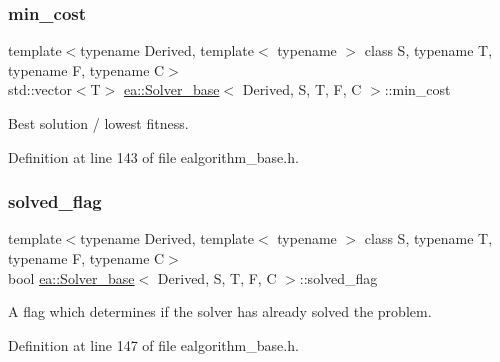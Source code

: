 \mbox{\label{classea_1_1_solver__base_af745cded954be26280d842c1e7c7f989}} 
\subsubsection{\texorpdfstring{min\+\_\+cost}{min\_cost}}
{\footnotesize\ttfamily template$<$typename Derived, template$<$ typename $>$ class S, typename T, typename F, typename C$>$ \\
std\+::vector$<$T$>$ \hyperlink{classea_1_1_solver__base}{ea\+::\+Solver\+\_\+base}$<$ Derived, S, T, F, C $>$\+::min\+\_\+cost\hspace{0.3cm}{\ttfamily [protected]}}



Best solution / lowest fitness. 



Definition at line 143 of file ealgorithm\+\_\+base.\+h.

\mbox{\label{classea_1_1_solver__base_a1cdb824e8df6d4a8f228820ea85c9b05}} 
\subsubsection{\texorpdfstring{solved\+\_\+flag}{solved\_flag}}
{\footnotesize\ttfamily template$<$typename Derived, template$<$ typename $>$ class S, typename T, typename F, typename C$>$ \\
bool \hyperlink{classea_1_1_solver__base}{ea\+::\+Solver\+\_\+base}$<$ Derived, S, T, F, C $>$\+::solved\+\_\+flag\hspace{0.3cm}{\ttfamily [protected]}}



A flag which determines if the solver has already solved the problem. 



Definition at line 147 of file ealgorithm\+\_\+base.\+h.

\mbox{\label{classea_1_1_solver__base_a5e1d821809f2d26c6f882942ad728127}} 
